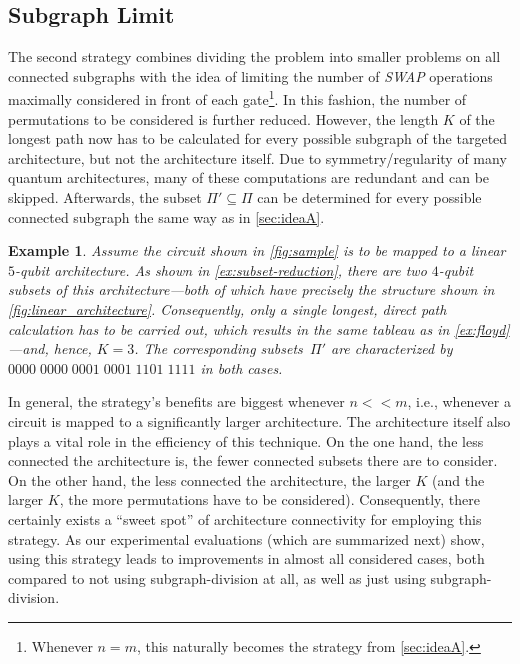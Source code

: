 \documentclass[10pt,conference]{IEEEtran}
\newtheorem{example}{Example}
\begin{document}
\subsection{Subgraph Limit}\label{sec:ideaB}
The second strategy combines dividing the problem into smaller problems on all connected subgraphs with the idea of limiting the number of \textit{SWAP} operations maximally considered in front of each gate\footnote{Whenever $n=m$, this naturally becomes the strategy from \autoref{sec:ideaA}.}.
In this fashion, the number of permutations to be considered is further reduced.
However, the length $K$ of the longest path now has to be calculated for every possible subgraph of the targeted architecture, but not the architecture itself.
Due to symmetry/regularity of many quantum architectures, many of these computations are redundant and can be skipped.
Afterwards, the subset $\Pi'\subseteq \Pi$ can be determined for every possible connected subgraph the same way as in \autoref{sec:ideaA}.

\begin{example}
	Assume the circuit shown in \autoref{fig:sample} is to be mapped to a linear $5$-qubit architecture. As shown in \autoref{ex:subset-reduction}, there are two $4$-qubit subsets of this architecture---both of which have precisely the structure shown in \autoref{fig:linear_architecture}.
	Consequently, only a single longest, direct path calculation has to be carried out, which results in the same tableau as in \autoref{ex:floyd}---and, hence, $K=3$.
	The corresponding subsets~$\Pi'$ are characterized by $0000\; 0000\; 0001\; 0001\; 1101\; 1111$ in both cases.
\end{example}
 
In general, the strategy's benefits are biggest whenever $n<<m$, i.e., whenever a circuit is mapped to a significantly larger architecture. 
The architecture itself also plays a vital role in the efficiency of this technique.
On the one hand, the less connected the architecture is, the fewer connected subsets there are to consider. 
On the other hand, the less connected the architecture, the larger $K$ (and the larger $K$, the more permutations have to be considered).
Consequently, there certainly exists a ``sweet spot'' of architecture connectivity for employing this strategy. 
As our experimental evaluations (which are summarized next) show, using this strategy leads to improvements in almost all considered cases, both compared to not using subgraph-division at all, as well as just using subgraph-division.
\end{document}
